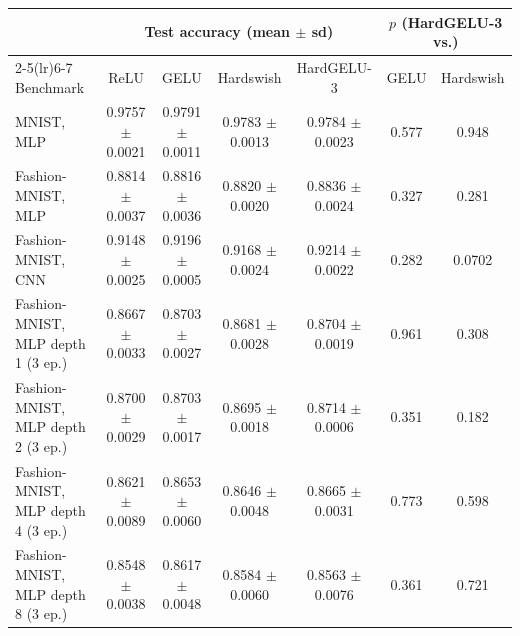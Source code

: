 \begin{tabular}{lcccccc}
\toprule
 & \multicolumn{4}{c}{Test accuracy (mean $\pm$ sd)} & \multicolumn{2}{c}{$p$ (HardGELU-3 vs.)} \\
\cmidrule(lr){2-5}\cmidrule(lr){6-7}
Benchmark & ReLU & GELU & Hardswish & HardGELU-3 & GELU & Hardswish \\
\midrule
MNIST, MLP & 0.9757 $\pm$ 0.0021 & 0.9791 $\pm$ 0.0011 & 0.9783 $\pm$ 0.0013 & 0.9784 $\pm$ 0.0023 & 0.577 & 0.948 \\
Fashion-MNIST, MLP & 0.8814 $\pm$ 0.0037 & 0.8816 $\pm$ 0.0036 & 0.8820 $\pm$ 0.0020 & 0.8836 $\pm$ 0.0024 & 0.327 & 0.281 \\
Fashion-MNIST, CNN & 0.9148 $\pm$ 0.0025 & 0.9196 $\pm$ 0.0005 & 0.9168 $\pm$ 0.0024 & 0.9214 $\pm$ 0.0022 & 0.282 & 0.0702 \\
Fashion-MNIST, MLP depth 1 (3 ep.) & 0.8667 $\pm$ 0.0033 & 0.8703 $\pm$ 0.0027 & 0.8681 $\pm$ 0.0028 & 0.8704 $\pm$ 0.0019 & 0.961 & 0.308 \\
Fashion-MNIST, MLP depth 2 (3 ep.) & 0.8700 $\pm$ 0.0029 & 0.8703 $\pm$ 0.0017 & 0.8695 $\pm$ 0.0018 & 0.8714 $\pm$ 0.0006 & 0.351 & 0.182 \\
Fashion-MNIST, MLP depth 4 (3 ep.) & 0.8621 $\pm$ 0.0089 & 0.8653 $\pm$ 0.0060 & 0.8646 $\pm$ 0.0048 & 0.8665 $\pm$ 0.0031 & 0.773 & 0.598 \\
Fashion-MNIST, MLP depth 8 (3 ep.) & 0.8548 $\pm$ 0.0038 & 0.8617 $\pm$ 0.0048 & 0.8584 $\pm$ 0.0060 & 0.8563 $\pm$ 0.0076 & 0.361 & 0.721 \\
\bottomrule
\end{tabular}

